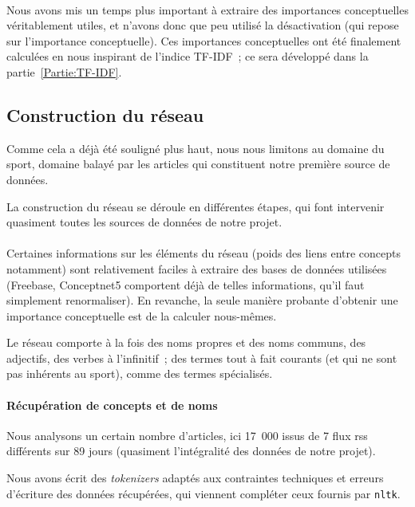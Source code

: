 \documentclass[a4paper, 12pt]{article}
\newcommand{\pyt}[1]{\texttt{#1}}%
\newcommand{\ang}[1]{\textit{#1}}%
\begin{document}
\paragraph{}
Nous avons mis un temps plus important à extraire des importances conceptuelles véritablement utiles, et n'avons donc que peu utilisé la désactivation (qui repose sur l'importance conceptuelle). Ces importances conceptuelles ont été finalement calculées en nous inspirant de l'indice TF-IDF~; ce sera développé dans la partie~\ref{Partie:TF-IDF}.



\subsection{Construction du réseau}
Comme cela a déjà été souligné plus haut, nous nous limitons au domaine du sport, domaine balayé par les articles qui constituent notre première source de données. 

La construction du réseau se déroule en différentes étapes, qui font intervenir quasiment toutes les sources de données de notre projet.


\paragraph{}
Certaines informations sur les éléments du réseau (poids des liens entre concepts notamment) sont relativement faciles à extraire des bases de données utilisées (Freebase, Conceptnet5 comportent déjà de telles informations, qu'il faut simplement renormaliser). En revanche, la seule manière probante d'obtenir une importance conceptuelle est de la calculer nous-mêmes.

Le réseau comporte à la fois des noms propres et des noms communs, des adjectifs, des verbes à l'infinitif~; des termes tout à fait courants (et qui ne sont pas inhérents au sport), comme des termes spécialisés.



\paragraph{Récupération de concepts et de noms}

Nous analysons un certain nombre d'articles, ici 17~000 issus de 7 flux rss différents sur 89 jours (quasiment l'intégralité des données de notre projet).


Nous avons écrit des \ang{tokenizers} adaptés aux contraintes techniques et erreurs d'écriture des données récupérées, qui viennent compléter ceux fournis par \pyt{nltk}.
\end{document}
